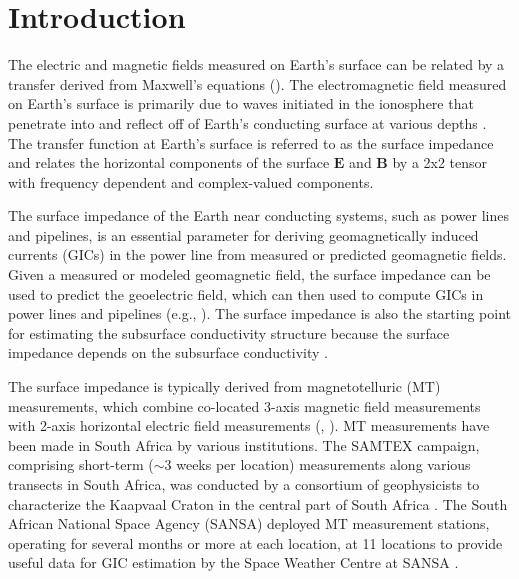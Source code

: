 \documentclass[pdflatex,sn-basic]{sn-jnl}%
\begin{document}

\maketitle

\section{Introduction}

The electric and magnetic fields measured on Earth's surface can be related by a transfer derived from Maxwell's equations (\cite{Vozoff1991, Simpson2005, Utada2026}). The electromagnetic field measured on Earth's surface is primarily due to waves initiated in the ionosphere that penetrate into and reflect off of Earth's conducting surface at various depths \citep{Cagniard1953,Pirjola1982}. The transfer function at Earth's surface is referred to as the surface impedance and relates the horizontal components of the surface $\mathbf{E}$ and $\mathbf{B}$ by a 2x2 tensor with frequency dependent and complex-valued components.

The surface impedance of the Earth near conducting systems, such as power lines and pipelines, is an essential parameter for deriving geomagnetically induced currents (GICs) in the power line from measured or predicted geomagnetic fields. Given a measured or modeled geomagnetic field, the surface impedance can be used to predict the geoelectric field, which can then used to compute GICs in power lines and pipelines (e.g., \cite{Marshall2019,AlvesRibeiro2023}). The surface impedance is also the starting point for estimating the subsurface  conductivity structure because the surface impedance depends on the subsurface conductivity \citep{Simpson2005}.

The surface impedance is typically derived from magnetotelluric (MT) measurements, which combine co-located 3-axis magnetic field measurements with 2-axis horizontal electric field measurements (\cite{Naidu2012}, \cite{Simpson2005}). MT measurements have been made in South Africa by various institutions. The SAMTEX campaign, comprising short-term ($\sim$3 weeks per location) measurements along various transects in South Africa, was conducted by a consortium of geophysicists to characterize the Kaapvaal Craton in the central part of South Africa \citep{Jones2009}. The South African National Space Agency (SANSA) deployed MT measurement stations, operating for several months or more at each location, at 11 locations to provide useful data for GIC estimation by the Space Weather Centre at SANSA \citep{Kotz2015}.
\end{document}

